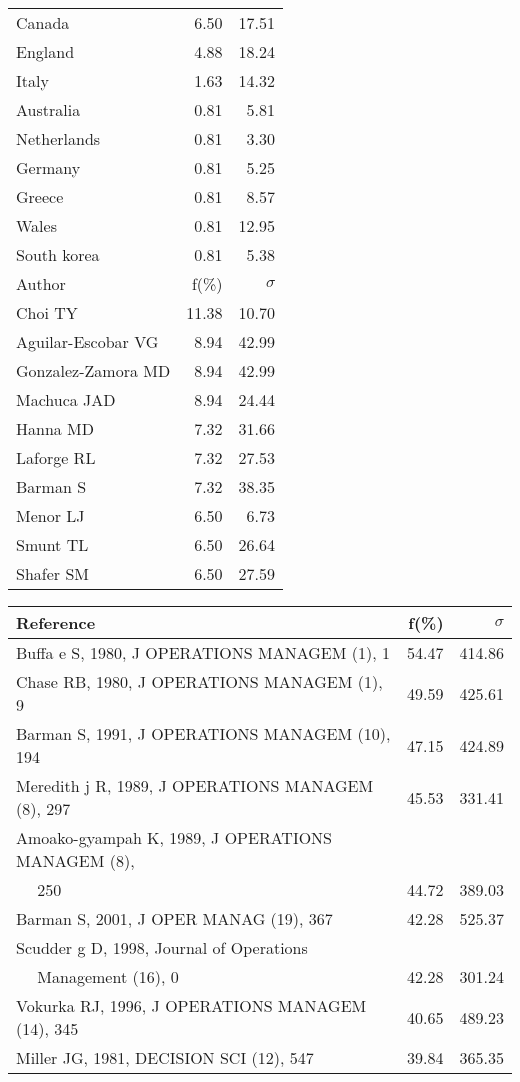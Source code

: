 \documentclass[a4paper,11pt]{report}
\begin{document}
\begin{landscape}
\begin{table}[!ht]
{\begin{tabular}{|l r r|}
Canada & 6.50 & 17.51\\
England & 4.88 & 18.24\\
Italy & 1.63 & 14.32\\
Australia & 0.81 & 5.81\\
Netherlands & 0.81 & 3.30\\
Germany & 0.81 & 5.25\\
Greece & 0.81 & 8.57\\
Wales & 0.81 & 12.95\\
South korea & 0.81 & 5.38\\
\hline
\hline
Author & f(\%) & $\sigma$\\
\hline
Choi TY & 11.38 & 10.70\\
Aguilar-Escobar VG & 8.94 & 42.99\\
Gonzalez-Zamora MD & 8.94 & 42.99\\
Machuca JAD & 8.94 & 24.44\\
Hanna MD & 7.32 & 31.66\\
Laforge RL & 7.32 & 27.53\\
Barman S & 7.32 & 38.35\\
Menor LJ & 6.50 & 6.73\\
Smunt TL & 6.50 & 26.64\\
Shafer SM & 6.50 & 27.59\\
\hline
\end{tabular}
}
{\scriptsize\begin{tabular}{|l r r|}
\hline
Reference & f(\%) & $\sigma$\\
\hline
Buffa e S, 1980, J OPERATIONS MANAGEM (1), 1 & 54.47 & 414.86\\
Chase RB, 1980, J OPERATIONS MANAGEM (1), 9 & 49.59 & 425.61\\
Barman S, 1991, J OPERATIONS MANAGEM (10), 194 & 47.15 & 424.89\\
Meredith j R, 1989, J OPERATIONS MANAGEM (8), 297 & 45.53 & 331.41\\
Amoako-gyampah K, 1989, J OPERATIONS MANAGEM (8), &  & \\
$\quad$ 250 & 44.72 & 389.03\\
Barman S, 2001, J OPER MANAG (19), 367 & 42.28 & 525.37\\
Scudder g D, 1998, Journal of Operations &  & \\
$\quad$ Management (16), 0 & 42.28 & 301.24\\
Vokurka RJ, 1996, J OPERATIONS MANAGEM (14), 345 & 40.65 & 489.23\\
Miller JG, 1981, DECISION SCI (12), 547 & 39.84 & 365.35\\

\end{tabular}}
\end{table}
\end{landscape}
\end{document}
